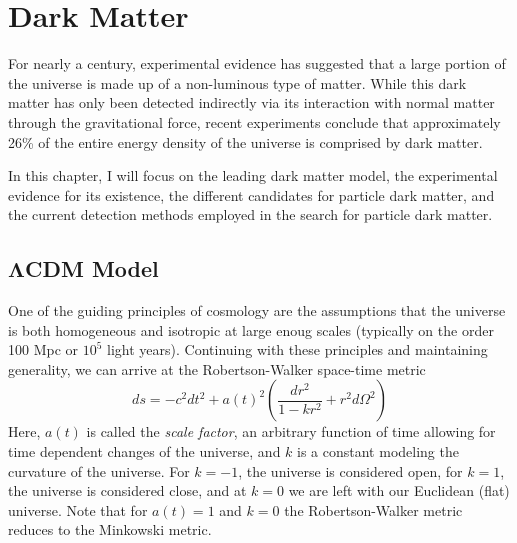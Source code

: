 

\pagestyle{cu}
\graphicspath{{./Chapter1/images/}}

\chapter[Dark Matter][Dark Matter]{Dark Matter}

For nearly a century, experimental evidence has suggested that a large portion of the universe is made up of a non-luminous type of matter.  While this dark matter has only been detected indirectly via its interaction with normal matter through the gravitational force, recent experiments conclude that approximately 26\% of the entire energy density of the universe is comprised by dark matter.

	In this chapter, I will focus on the leading dark matter model, the experimental evidence for its existence, the different candidates for particle dark matter, and the current detection methods employed in the search for particle dark matter.
	
	
\section{$\boldsymbol{\Lambda}$CDM Model}
\label{sec:cdm}

	One of the guiding principles of cosmology are the assumptions that the universe is both homogeneous and isotropic at large enoug scales (typically on the order 100 Mpc or $10^{5}$ light years).  Continuing with these principles and maintaining generality, we can arrive at the Robertson-Walker space-time metric
	\begin{equation}
		ds = -c^{2}dt^{2} + a(t)^{2}\left( \dfrac{dr^{2}}{1 - kr^{2}} + r^{2}d\Omega^{2}\right)
	\end{equation}
Here, $a(t)$ is called the \emph{scale factor}, an arbitrary function of time allowing for time dependent changes of the universe, and $k$ is a constant modeling the curvature of the universe.  For $k=-1$, the universe is considered open, for $k=1$, the universe is considered close, and at $k=0$ we are left with our Euclidean (flat) universe.  Note that for $a(t) = 1$ and $k = 0$ the Robertson-Walker metric reduces to the Minkowski metric.

